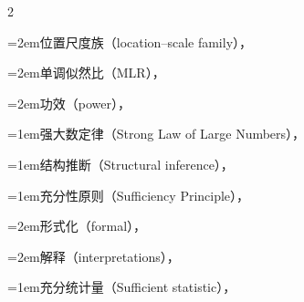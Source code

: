 \begin{multicols}{2}
\par\noindent\hangindent=2em\hspace*{1em}\label{idx:992}位置尺度族（location–scale family），\hyperref[exercise:8.34]{\pageref*{exercise:8.34}}\par
{}
\par\noindent\hangindent=2em\hspace*{1em}\label{idx:993}单调似然比（MLR），\hyperref[exercise:8.26]{\pageref*{exercise:8.26}}\par
\par\noindent\hangindent=2em\hspace*{1em}\label{idx:994}功效（power），\hyperref[sec:8.5.1]{\pageref*{sec:8.5.1}}\par
\par\addvspace{2pt}
\par\noindent\hangindent=1em\hspace*{0em}\label{idx:995}强大数定律（Strong Law of Large Numbers），\hyperref[sec:5.8.4]{\pageref*{sec:5.8.4}}\par
\par\addvspace{2pt}
\par\noindent\hangindent=1em\hspace*{0em}\label{idx:996}结构推断（Structural inference），\hyperref[idxocc:996:376]{\pageref*{idxocc:996:376}}\par
\par\addvspace{2pt}
\par\noindent\hangindent=1em\hspace*{0em}\label{idx:997}充分性原则（Sufficiency Principle），\hyperref[idxocc:997:252]{\pageref*{idxocc:997:252}}\par
\par\noindent\hangindent=2em\hspace*{1em}\label{idx:998}形式化（formal），\hyperref[idxocc:998:269]{\pageref*{idxocc:998:269}}\par
\par\noindent\hangindent=2em\hspace*{1em}\label{idx:999}解释（interpretations），\hyperref[ex:6.3.7]{\pageref*{ex:6.3.7}}\par
\par\addvspace{2pt}
\par\noindent\hangindent=1em\hspace*{0em}\label{idx:1000}充分统计量（Sufficient statistic），\hyperref[def:6.2.1]{\pageref*{def:6.2.1}}\par

\end{multicols}
